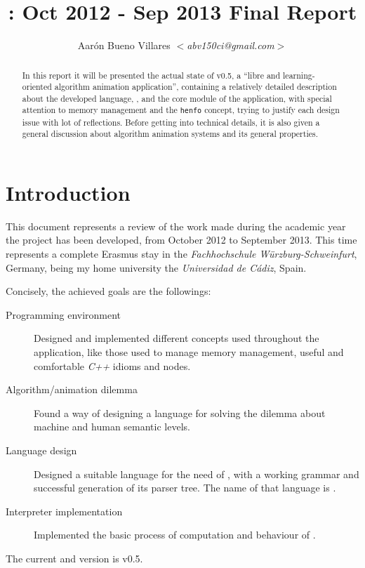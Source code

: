 \documentclass{article}
\title{\fav: Oct 2012 - Sep 2013 Final Report}
\author{Aarón Bueno Villares \textit{$<$abv150ci@gmail.com$>$}}
\begin{document}
\maketitle

\begin{abstract}
  In this report it will be presented the actual state of \fav v0.5, a ``libre
  and learning-oriented algorithm animation application'', containing a
  relatively detailed description about the developed language, \faupp, and the
  core module of the application, with special attention to memory management
  and the \texttt{henfo} concept, trying to justify each design issue with lot
  of reflections. Before getting into technical details, it is also given a
  general discussion about algorithm animation systems and its general
  properties.
\end{abstract}

\tableofcontents

\section{Introduction}
This document represents a review of the work made during the academic year the
project has been developed, from October 2012 to September 2013. This time
represents a complete Erasmus stay in the \textit{Fachhochschule
  Würzburg-Schweinfurt}, Germany, being my home university the
\textit{Universidad de Cádiz}, Spain.

Concisely, the achieved goals are the followings:

\begin{description}
  \item[Programming environment] Designed and implemented different concepts
    used throughout the application, like those used to manage memory
    management, useful and comfortable \textit{C++} idioms and nodes.
  \item[Algorithm/animation dilemma] Found a way of designing a language for
    solving the dilemma about machine and human semantic levels.
  \item[Language design] Designed a suitable language for the need of \fav, with
    a working grammar and successful generation of its parser tree. The name of
    that language is \faupp.
  \item[Interpreter implementation] Implemented the basic process of computation
    and behaviour of \faupp.
\end{description}

The current \fav and \faupp version is v0.5.
\end{document}

